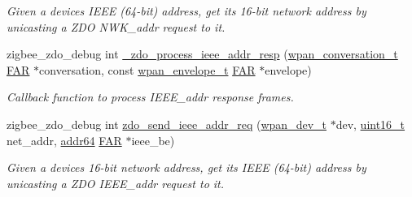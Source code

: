 \begin{DoxyCompactItemize}
\begin{DoxyCompactList}\small\item\em Given a device\textquotesingle{}s I\+E\+EE (64-\/bit) address, get its 16-\/bit network address by unicasting a Z\+DO N\+W\+K\+\_\+addr request to it. \end{DoxyCompactList}\item 
zigbee\+\_\+zdo\+\_\+debug int \hyperlink{group__zdo_gad723bd899ccda9ec96f6226893c1335b}{\+\_\+zdo\+\_\+process\+\_\+ieee\+\_\+addr\+\_\+resp} (\hyperlink{structwpan__conversation__t}{wpan\+\_\+conversation\+\_\+t} \hyperlink{group__hal_gaef060b3456fdcc093a7210a762d5f2ed}{F\+AR} $\ast$conversation, const \hyperlink{structwpan__envelope__t}{wpan\+\_\+envelope\+\_\+t} \hyperlink{group__hal_gaef060b3456fdcc093a7210a762d5f2ed}{F\+AR} $\ast$envelope)
\begin{DoxyCompactList}\small\item\em Callback function to process I\+E\+E\+E\+\_\+addr response frames. \end{DoxyCompactList}\item 
zigbee\+\_\+zdo\+\_\+debug int \hyperlink{group__zdo_ga4af5f8d70054f7883dbc1305e3a3f181}{zdo\+\_\+send\+\_\+ieee\+\_\+addr\+\_\+req} (\hyperlink{structwpan__dev__t}{wpan\+\_\+dev\+\_\+t} $\ast$dev, \hyperlink{group__hal__dos_ga5a8b2dc9e45a9ee81a94ef304fb62505}{uint16\+\_\+t} net\+\_\+addr, \hyperlink{unionaddr64}{addr64} \hyperlink{group__hal_gaef060b3456fdcc093a7210a762d5f2ed}{F\+AR} $\ast$ieee\+\_\+be)
\begin{DoxyCompactList}\small\item\em Given a device\textquotesingle{}s 16-\/bit network address, get its I\+E\+EE (64-\/bit) address by unicasting a Z\+DO I\+E\+E\+E\+\_\+addr request to it. \end{DoxyCompactList}\end{DoxyCompactItemize}
